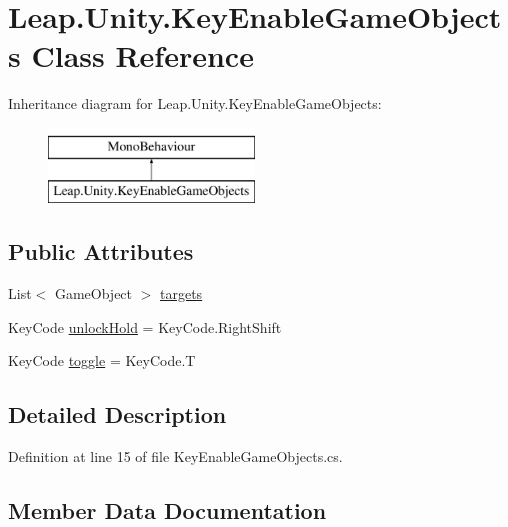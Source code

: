 \hypertarget{class_leap_1_1_unity_1_1_key_enable_game_objects}{}\section{Leap.\+Unity.\+Key\+Enable\+Game\+Objects Class Reference}
\label{class_leap_1_1_unity_1_1_key_enable_game_objects}
Inheritance diagram for Leap.\+Unity.\+Key\+Enable\+Game\+Objects\+:\begin{figure}[H]
\begin{center}
\leavevmode
\includegraphics[height=2.000000cm]{class_leap_1_1_unity_1_1_key_enable_game_objects}
\end{center}
\end{figure}
\subsection*{Public Attributes}
\begin{DoxyCompactItemize}
\item 
List$<$ Game\+Object $>$ \mbox{\hyperlink{class_leap_1_1_unity_1_1_key_enable_game_objects_a75df1f3ca1429485442e9d8838aee2bf}{targets}}
\item 
Key\+Code \mbox{\hyperlink{class_leap_1_1_unity_1_1_key_enable_game_objects_a7b1409a340cf247957646c6d0bb3cb88}{unlock\+Hold}} = Key\+Code.\+Right\+Shift
\item 
Key\+Code \mbox{\hyperlink{class_leap_1_1_unity_1_1_key_enable_game_objects_ae90db079d50d4bc1e7e678eab1fab5fd}{toggle}} = Key\+Code.\+T
\end{DoxyCompactItemize}


\subsection{Detailed Description}


Definition at line 15 of file Key\+Enable\+Game\+Objects.\+cs.



\subsection{Member Data Documentation}
\mbox{\label{class_leap_1_1_unity_1_1_key_enable_game_objects_a75df1f3ca1429485442e9d8838aee2bf}} 
